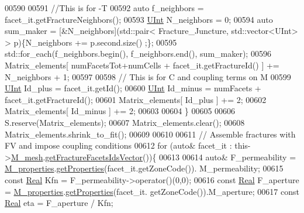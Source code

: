 \begin{DoxyCode}
00590                 
00591                 \textcolor{comment}{//This is for -T}
00592                 \textcolor{keyword}{auto} f\_neighbors = facet\_it.getFractureNeighbors();
00593                 \hyperlink{namespaceFVCode3D_a4bf7e328c75d0fd504050d040ebe9eda}{UInt} N\_neighbors = 0;
00594         \textcolor{keyword}{auto} sum\_maker = [&N\_neighbors](std::pair< Fracture\_Juncture, std::vector<UInt> > p)\{N\_neighbors +=
       p.second.size() ;\};
00595         std::for\_each(f\_neighbors.begin(), f\_neighbors.end(), sum\_maker);
00596                 Matrix\_elements[ numFacetsTot+numCells + facet\_it.getFractureId() ] += N\_neighbors + 1;
00597                 
00598                 \textcolor{comment}{// This is for C and coupling terms on M}
00599                 \hyperlink{namespaceFVCode3D_a4bf7e328c75d0fd504050d040ebe9eda}{UInt} Id\_plus   = facet\_it.getId();
00600                 \hyperlink{namespaceFVCode3D_a4bf7e328c75d0fd504050d040ebe9eda}{UInt} Id\_minus  = numFacets + facet\_it.getFractureId();
00601                 Matrix\_elements[ Id\_plus ]   += 2;
00602                 Matrix\_elements[ Id\_minus ]  += 2;
00603                 
00604         \}
00605     
00606     S.reserve(Matrix\_elements);
00607     Matrix\_elements.clear();
00608     Matrix\_elements.shrink\_to\_fit();
00609 
00610 
00611     \textcolor{comment}{// Assemble fractures with FV and impose coupling conditions}
00612     \textcolor{keywordflow}{for} (\textcolor{keyword}{auto}& facet\_it : this->\hyperlink{classFVCode3D_1_1MatrixHandler_a72f185cb557fc2e8023bd09a074f685c}{M\_mesh}.\hyperlink{classFVCode3D_1_1Rigid__Mesh_aadbe6d9ad704122537903396d91238e0}{getFractureFacetsIdsVector}())\{
00613                 
00614         \textcolor{keyword}{auto}& F\_permeability = \hyperlink{classFVCode3D_1_1MatrixHandler_ad17a7941b1b8272f50fc6e1c660103fa}{M\_properties}.\hyperlink{classFVCode3D_1_1PropertiesMap_ace888d15c9a4ab13d5e217a3a565604c}{getProperties}(facet\_it.getZoneCode()).
      M\_permeability;
00615         \textcolor{keyword}{const} \hyperlink{namespaceFVCode3D_a40c1f5588a248569d80aa5f867080e83}{Real} Kfn = F\_permeability->operator()(0,0);
00616         \textcolor{keyword}{const} \hyperlink{namespaceFVCode3D_a40c1f5588a248569d80aa5f867080e83}{Real} F\_aperture = \hyperlink{classFVCode3D_1_1MatrixHandler_ad17a7941b1b8272f50fc6e1c660103fa}{M\_properties}.\hyperlink{classFVCode3D_1_1PropertiesMap_ace888d15c9a4ab13d5e217a3a565604c}{getProperties}(facet\_it.
      getZoneCode()).M\_aperture;
00617                 \textcolor{keyword}{const} \hyperlink{namespaceFVCode3D_a40c1f5588a248569d80aa5f867080e83}{Real} eta = F\_aperture / Kfn;

\end{DoxyCode}
